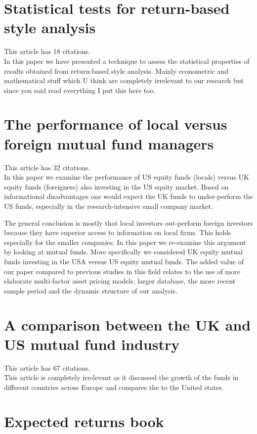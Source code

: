 \documentclass[12 pt]{article}
\begin{document}
\section{Statistical tests for return-based style analysis}
This article has 18 citations.\\
In this paper we have presented a technique to assess the statistical properties of results
obtained from return-based style analysis. Mainly econometric and mathematical stuff which U think are completely irrelevant to our research but since you said read everything I put this here too.
\section{The performance of local versus foreign mutual fund managers}
This article has 32 citations.\\
In this paper we examine the performance of US equity funds (locals) versus UK equity funds (foreigners) also investing in the US equity market. Based on informational disadvantages one would expect the UK funds to under-perform the US funds, especially in the research-intensive small company market.
\par The general conclusion is mostly that local investors out-perform foreign investors because they have superior access to information on local firms. This holds especially for the smaller companies. In this paper we re-examine this argument by looking at mutual funds. More specifically we considered UK equity mutual funds investing in the USA versus US equity mutual funds. The added value of our paper compared to previous studies in this field relates to the use of more elaborate multi-factor asset pricing models, larger database, the more recent sample period and the dynamic structure of our analysis.
\section{A comparison between the UK and US mutual fund industry}
This article has 67 citations.\\
This article is completely irrelevant as it discussed the growth of the funds in different countries across Europe and compares the to the United states. 
\section{Expected returns book}
\end{document}
